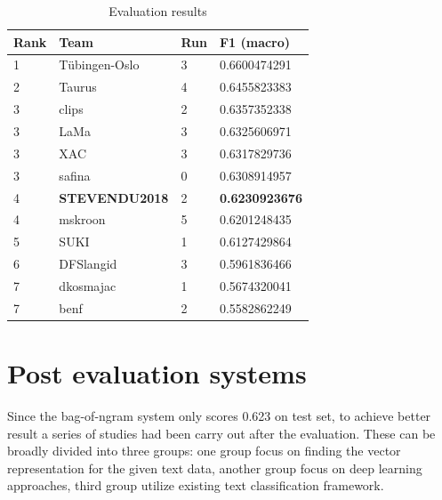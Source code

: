 \documentclass[11pt]{article}
\begin{document}
\begin{table}[h]
	\centering

	\begin{tabular}{|l|l|l|l|}
		 \hline
		Rank & Team         & Run & F1 (macro)     \\  \hline
		1    & Tübingen-Oslo & 3   & 0.6600474291   \\  \hline
		2                          & Taurus                            & 4                        & 0.6455823383   \\  \hline
		3                          & clips                             & 2                        & 0.6357352338   \\  \hline
		3                          & LaMa                              & 3                        & 0.6325606971   \\ \hline
		3                          & XAC                               & 3                        & 0.6317829736   \\ \hline
		3                          & safina                            & 0                        & 0.6308914957   \\ \hline
		4                          & \textbf{STEVENDU2018}                      & 2                        & \textbf{0.6230923676}   \\ \hline
		4                          & mskroon                           & 5                        & 0.6201248435   \\ \hline
		5                          & SUKI                              & 1                        & 0.6127429864   \\ \hline
		6                          & DFSlangid                         & 3                        & 0.5961836466   \\ \hline
		7                          & dkosmajac                         & 1                        & 0.5674320041   \\ \hline
		7                          & benf                              & 2                        & 0.5582862249   \\  \hline
	\end{tabular}	
	\caption{Evaluation results}
	\label{my-label}
\end{table}

\section{Post evaluation systems}
Since the bag-of-ngram system only scores 0.623 on test set, to achieve better result a series of studies had been carry out after the evaluation. These can be broadly divided into three groups: one group focus on finding the vector representation for the given text data, another group focus on deep learning approaches, third group utilize existing text classification framework. %
\end{document}

